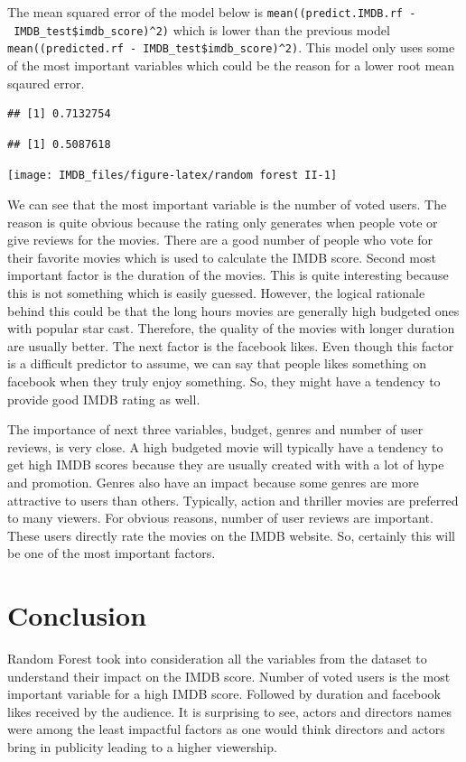 \documentclass[
]{article}
\begin{document}
The mean squared error of the model below is
\texttt{mean((predict.IMDB.rf\ -\ IMDB\_test\$imdb\_score)\^{}2)} which
is lower than the previous model
\texttt{mean((predicted.rf\ -\ IMDB\_test\$imdb\_score)\^{}2)}. This
model only uses some of the most important variables which could be the
reason for a lower root mean sqaured error.

\begin{verbatim}
## [1] 0.7132754
\end{verbatim}

\begin{verbatim}
## [1] 0.5087618
\end{verbatim}

\texttt{[image: IMDB\_files/figure-latex/random forest II-1]}

We can see that the most important variable is the number of voted
users. The reason is quite obvious because the rating only generates
when people vote or give reviews for the movies. There are a good number
of people who vote for their favorite movies which is used to calculate
the IMDB score. Second most important factor is the duration of the
movies. This is quite interesting because this is not something which is
easily guessed. However, the logical rationale behind this could be that
the long hours movies are generally high budgeted ones with popular star
cast. Therefore, the quality of the movies with longer duration are
usually better. The next factor is the facebook likes. Even though this
factor is a difficult predictor to assume, we can say that people likes
something on facebook when they truly enjoy something. So, they might
have a tendency to provide good IMDB rating as well.

The importance of next three variables, budget, genres and number of
user reviews, is very close. A high budgeted movie will typically have a
tendency to get high IMDB scores because they are usually created with
with a lot of hype and promotion. Genres also have an impact because
some genres are more attractive to users than others. Typically, action
and thriller movies are preferred to many viewers. For obvious reasons,
number of user reviews are important. These users directly rate the
movies on the IMDB website. So, certainly this will be one of the most
important factors.

\hypertarget{conclusion}{%
\section{Conclusion}\label{conclusion}}

Random Forest took into consideration all the variables from the dataset
to understand their impact on the IMDB score. Number of voted users is
the most important variable for a high IMDB score. Followed by duration
and facebook likes received by the audience. It is surprising to see,
actors and directors names were among the least impactful factors as one
would think directors and actors bring in publicity leading to a higher
viewership.
\end{document}
